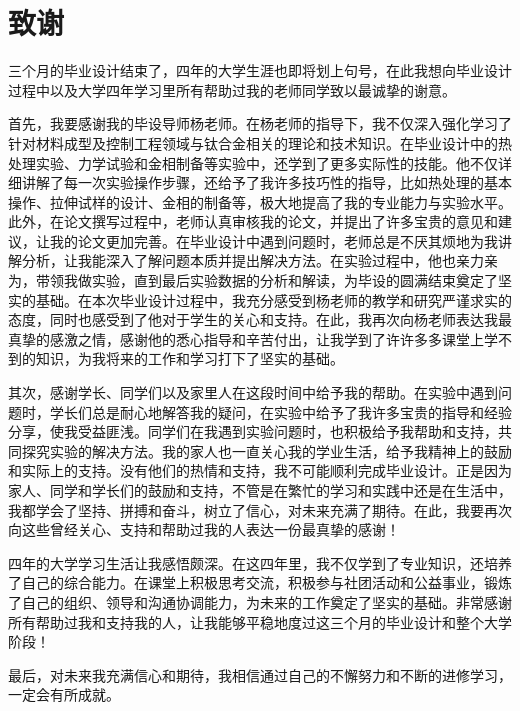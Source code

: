 \chapter{致谢}
三个月的毕业设计结束了，四年的大学生涯也即将划上句号，在此我想向毕业设计过程中以及大学四年学习里所有帮助过我的老师同学致以最诚挚的谢意。

首先，我要感谢我的毕设导师杨老师。在杨老师的指导下，我不仅深入强化学习了针对材料成型及控制工程领域与钛合金相关的理论和技术知识。在毕业设计中的热处理实验、力学试验和金相制备等实验中，还学到了更多实际性的技能。他不仅详细讲解了每一次实验操作步骤，还给予了我许多技巧性的指导，比如热处理的基本操作、拉伸试样的设计、金相的制备等，极大地提高了我的专业能力与实验水平。此外，在论文撰写过程中，老师认真审核我的论文，并提出了许多宝贵的意见和建议，让我的论文更加完善。在毕业设计中遇到问题时，老师总是不厌其烦地为我讲解分析，让我能深入了解问题本质并提出解决方法。在实验过程中，他也亲力亲为，带领我做实验，直到最后实验数据的分析和解读，为毕设的圆满结束奠定了坚实的基础。在本次毕业设计过程中，我充分感受到杨老师的教学和研究严谨求实的态度，同时也感受到了他对于学生的关心和支持。在此，我再次向杨老师表达我最真挚的感激之情，感谢他的悉心指导和辛苦付出，让我学到了许许多多课堂上学不到的知识，为我将来的工作和学习打下了坚实的基础。

其次，感谢学长、同学们以及家里人在这段时间中给予我的帮助。在实验中遇到问题时，学长们总是耐心地解答我的疑问，在实验中给予了我许多宝贵的指导和经验分享，使我受益匪浅。同学们在我遇到实验问题时，也积极给予我帮助和支持，共同探究实验的解决方法。我的家人也一直关心我的学业生活，给予我精神上的鼓励和实际上的支持。没有他们的热情和支持，我不可能顺利完成毕业设计。正是因为家人、同学和学长们的鼓励和支持，不管是在繁忙的学习和实践中还是在生活中，我都学会了坚持、拼搏和奋斗，树立了信心，对未来充满了期待。在此，我要再次向这些曾经关心、支持和帮助过我的人表达一份最真挚的感谢！

四年的大学学习生活让我感悟颇深。在这四年里，我不仅学到了专业知识，还培养了自己的综合能力。在课堂上积极思考交流，积极参与社团活动和公益事业，锻炼了自己的组织、领导和沟通协调能力，为未来的工作奠定了坚实的基础。非常感谢所有帮助过我和支持我的人，让我能够平稳地度过这三个月的毕业设计和整个大学阶段！

最后，对未来我充满信心和期待，我相信通过自己的不懈努力和不断的进修学习，一定会有所成就。
